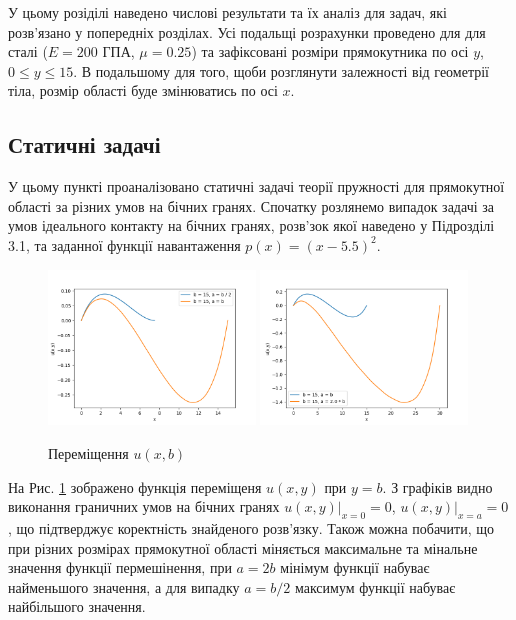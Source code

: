 У цьому розіділі наведено числові результати та їх аналіз для задач,
які розв'язано у попередніх розділах.
Усі подальщі розрахунки проведено для для сталі ($E=200$ ГПА, $\mu=0.25$) та зафіксовані розміри прямокутника по осі $y$, $0 \le y \le 15$.
В подальшому для того, щоби розглянути залежності від геометрії тіла,
розмір області буде змінюватись по осі $x$.

\subsection{Статичні задачі}

У цьому пункті проаналізовано статичні задачі теорії пружності для прямокутної області за різних умов на бічних гранях.
Спочатку розлянемо випадок задачі за умов ідеального контакту на бічних гранях,
розв'зок якої наведено у Підрозділі 3.1, та заданної функції навантаження $p(x) = (x - 5.5)^2$.
\begin{figure}[h!]
    \begin{center}
        \includegraphics[width=0.49\textwidth, scale=1]{images/results/static_1/u(x,b)1.png}
        \includegraphics[width=0.49\textwidth, scale=1]{images/results/static_1/u(x,b)2.png}
        \caption{Переміщення $u(x, b)$}\label{static_1_u(x,b)}
    \end{center}
\end{figure}

На Рис. \ref{static_1_u(x,b)} зображено функція переміщеня $u(x, y)$ при $y=b$.
З графіків видно виконання граничних умов на бічних гранях $u(x,y) |_{x=0} = 0$, $u(x,y) |_{x=a} = 0$,
що підтверджує коректність знайденого розв'язку.
Також можна побачити, що при різних розмірах прямокутної області міняється максимальне та мінальне значення функції пермешінення,
при $a = 2b$ мінімум функції набуває найменьшого значення, а для випадку $a = b / 2$ максимум функції набуває найбільшого значення.


